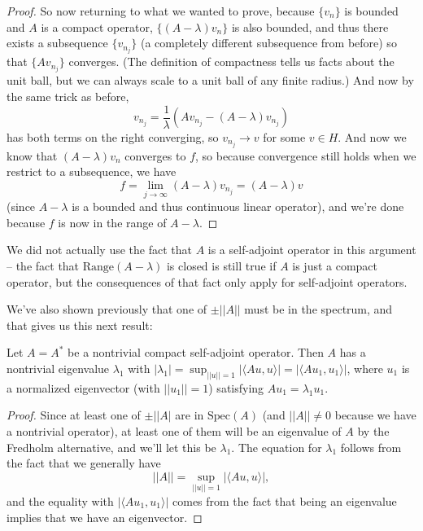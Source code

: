 \begin{proof}
So now returning to what we wanted to prove, because $\{v_n\}$ is bounded and $A$ is a compact operator, $\{(A - \lambda)v_n\}$ is also bounded, and thus there exists a subsequence $\{v_{n_j}\}$ (a completely different subsequence from before) so that $\{Av_{n_j}\}$ converges. (The definition of compactness tells us facts about the unit ball, but we can always scale to a unit ball of any finite radius.) And now by the same trick as before, 
\[
    v_{n_j} = \frac{1}{\lambda} \left(Av_{n_j} - (A - \lambda)v_{n_j}\right)
\]
has both terms on the right converging, so $v_{n_j} \to v$ for some $v \in H$. And now we know that $(A - \lambda)v_{n}$ converges to $f$, so because convergence still holds when we restrict to a subsequence, we have
\[
    f = \lim_{j \to \infty} (A - \lambda)v_{n_j} = (A - \lambda)v
\]
(since $A - \lambda$ is a bounded and thus continuous linear operator), and we're done because $f$ is now in the range of $A - \lambda$.
\end{proof}

\begin{remark}
We did not actually use the fact that $A$ is a self-adjoint operator in this argument -- the fact that $\text{Range}(A - \lambda)$ is closed is still true if $A$ is just a compact operator, but the consequences of that fact only apply for self-adjoint operators. 
\end{remark}

We've also shown previously that one of $\pm ||A||$ must be in the spectrum, and that gives us this next result:

\begin{theorem}
Let $A = A^\ast$ be a nontrivial compact self-adjoint operator. Then $A$ has a nontrivial eigenvalue $\lambda_1$ with $|\lambda_1| = \sup_{||u|| = 1} |\langle Au, u \rangle| = |\langle Au_1, u_1 \rangle|$, where $u_1$ is a normalized eigenvector (with $||u_1|| = 1$) satisfying $Au_1 = \lambda_1 u_1$.
\end{theorem}
\begin{proof}
Since at least one of $\pm ||A|$ are in $\text{Spec}(A)$ (and $||A|| \ne 0$ because we have a nontrivial operator), at least one of them will be an eigenvalue of $A$ by the Fredholm alternative, and we'll let this be $\lambda_1$. The equation for $\lambda_1$ follows from the fact that we generally have
\[
    ||A|| = \sup_{||u|| = 1} |\langle Au, u \rangle|,
\] 
and the equality with $|\langle Au_1, u_1 \rangle|$ comes from the fact that being an eigenvalue implies that we have an eigenvector. 
\end{proof}

